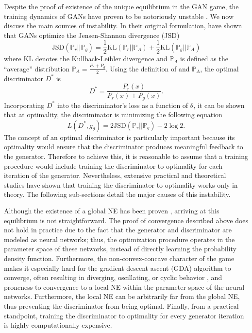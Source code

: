 \label{sec:gan-probs}
Despite the proof of existence of the unique equilibrium in the GAN game, the training dynamics of GANs have proven to be notoriously unstable . We now discuss the main sources of instability.
In their original formulation,  have shown that GANs optimize the Jensen-Shannon divergence (JSD)
\begin{equation}
    \text{JSD}(\mathbb{P}_{r}||\mathbb{P}_{g}) = \frac{1}{2}\text{KL}(\mathbb{P}_{r}||\mathbb{P}_{A}) + \frac{1}{2}\text{KL}(\mathbb{P}_{g}||\mathbb{P}_{A})
\end{equation}
where KL denotes the Kullback-Leibler divergence and $\mathbb{P}_{A}$ is defined as the ``average'' distribution $\mathbb{P}_{A} = \frac{P_{r}+P_{g}}{2}$. Using the definition of  and $\mathbb{P}_{A}$, the optimal discriminator $D^{*}$ is
\begin{equation}
    D^* = \frac{P_{r}(x)}{P_{r}(x) + P_{g}(x)}.
\end{equation}
Incorporating $D^*$ into the discriminator's loss as a function of $\theta$, it can be shown that at optimality, the discriminator is minimizing the following equation
\begin{equation}
    L(D^{*}, g_{\theta}) = \text{2JSD}(\mathbb{P}_{r}||\mathbb{P}_{g}) - 2\log2.
\end{equation}
The concept of an optimal discriminator is particularly important because its optimality would ensure that the discriminator produces meaningful feedback to the generator. Therefore to achieve this, it is reasonable to assume that a training procedure would include training the discriminator to optimality for each iteration of the generator. Nevertheless, extensive practical  and theoretical  studies have shown that training the discriminator to optimality works only in theory. The following sub-sections detail the major causes of this instability.

Although the existence of a global NE has been proven , arriving at this equilibrium is not straightforward. The proof of convergence described above does not hold in practice due to the fact that the generator and discriminator are modeled as neural networks; thus, the optimization procedure operates in the parameter space of these networks, instead of directly learning the probability density function. Furthermore, the non-convex-concave character of the game makes it especially hard for the gradient descent ascent (GDA) algorithm to converge, often resulting in diverging, oscillating, or cyclic behavior , and proneness to convergence to a local NE within the parameter space of the neural networks. Furthermore, the local NE can be arbitrarily far from the global NE, thus preventing the discriminator from being optimal. Finally, from a practical standpoint, training the discriminator to optimality for every generator iteration is highly computationally expensive.

